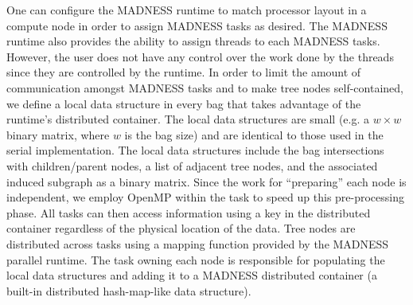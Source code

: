 \documentclass[conference]{IEEEtran}
\begin{document}
One can configure the MADNESS runtime to match processor layout in a compute node
in order to assign MADNESS tasks as desired.
The MADNESS runtime also provides the ability to assign threads to each MADNESS tasks. 
However, the user does not have any control over the work done by the threads 
since they are controlled by the runtime.
In order to limit the amount of communication amongst MADNESS tasks and to make tree nodes
self-contained, we define a local data structure in every bag that takes advantage of the
runtime's distributed container.
The local data structures are small (e.g. a $w\times w$ binary matrix, where $w$ is the bag size) 
and are identical to those used in the serial implementation. The local data structures
include the bag intersections with children/parent nodes, a list of adjacent tree nodes, and the associated induced subgraph as a binary matrix.  
Since the work for ``preparing'' each node is independent, we employ OpenMP within the task to speed up this pre-processing phase. All tasks can then access information using a key in the distributed container regardless of the physical location of the data. Tree nodes are distributed across tasks using a mapping function provided by the MADNESS parallel runtime. The task owning each node is responsible for populating the local data structures and adding it to a MADNESS distributed container (a built-in distributed hash-map-like data structure).

\end{document}
